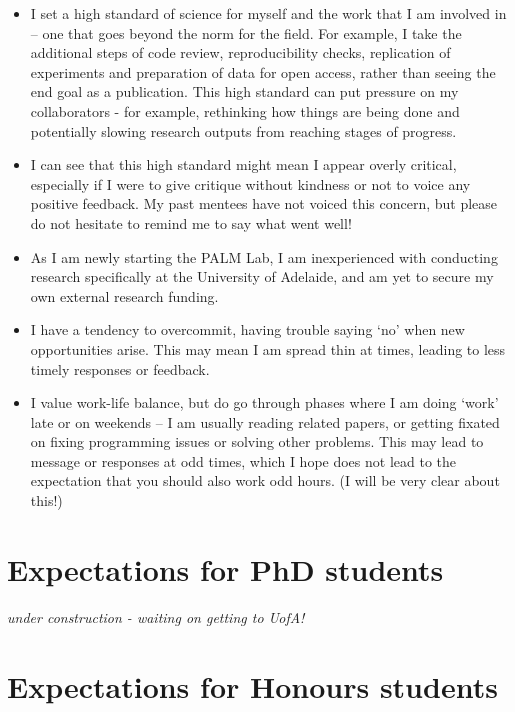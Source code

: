 \documentclass[
]{book}
\providecommand{\tightlist}{%
  \setlength{\itemsep}{0pt}\setlength{\parskip}{0pt}}
\begin{document}
\begin{itemize}
\tightlist
\item
  I set a high standard of science for myself and the work that I am involved in -- one that goes beyond the norm for the field. For example, I take the additional steps of code review, reproducibility checks, replication of experiments and preparation of data for open access, rather than seeing the end goal as a publication. This high standard can put pressure on my collaborators - for example, rethinking how things are being done and potentially slowing research outputs from reaching stages of progress.
\item
  I can see that this high standard might mean I appear overly critical, especially if I were to give critique without kindness or not to voice any positive feedback. My past mentees have not voiced this concern, but please do not hesitate to remind me to say what went well!
\item
  As I am newly starting the PALM Lab, I am inexperienced with conducting research specifically at the University of Adelaide, and am yet to secure my own external research funding.
\item
  I have a tendency to overcommit, having trouble saying `no' when new opportunities arise. This may mean I am spread thin at times, leading to less timely responses or feedback.
\item
  I value work-life balance, but do go through phases where I am doing `work' late or on weekends -- I am usually reading related papers, or getting fixated on fixing programming issues or solving other problems. This may lead to message or responses at odd times, which I hope does not lead to the expectation that you should also work odd hours. (I will be very clear about this!)
\end{itemize}

\hypertarget{student-expectations}{%
\section{Expectations for PhD students}\label{student-expectations}}

\emph{under construction - waiting on getting to UofA!}

\hypertarget{expectations-for-honours-students}{%
\section{Expectations for Honours students}\label{expectations-for-honours-students}}
\end{document}
